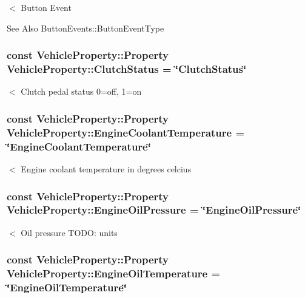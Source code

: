 $<$ Button Event\begin{DoxySeeAlso}{See Also}
Button\-Events\-::\-Button\-Event\-Type 
\end{DoxySeeAlso}
\hypertarget{classVehicleProperty_acdca2ca718fd392c7ad9b8adc817baec}{
\subsubsection[{Clutch\-Status}]{\setlength{\rightskip}{0pt plus 5cm}const Vehicle\-Property\-::\-Property Vehicle\-Property\-::\-Clutch\-Status = \char`\"{}Clutch\-Status\char`\"{}\hspace{0.3cm}{\ttfamily [static]}}}\label{classVehicleProperty_acdca2ca718fd392c7ad9b8adc817baec}
$<$ Clutch pedal status 0=off, 1=on \hypertarget{classVehicleProperty_ae4f240ad9cecbbb9d0cb3a615865b60a}{
\subsubsection[{Engine\-Coolant\-Temperature}]{\setlength{\rightskip}{0pt plus 5cm}const Vehicle\-Property\-::\-Property Vehicle\-Property\-::\-Engine\-Coolant\-Temperature = \char`\"{}Engine\-Coolant\-Temperature\char`\"{}\hspace{0.3cm}{\ttfamily [static]}}}\label{classVehicleProperty_ae4f240ad9cecbbb9d0cb3a615865b60a}
$<$ Engine coolant temperature in degrees celcius \hypertarget{classVehicleProperty_ab7fad273c7149dbd338f53f2536aca26}{
\subsubsection[{Engine\-Oil\-Pressure}]{\setlength{\rightskip}{0pt plus 5cm}const Vehicle\-Property\-::\-Property Vehicle\-Property\-::\-Engine\-Oil\-Pressure = \char`\"{}Engine\-Oil\-Pressure\char`\"{}\hspace{0.3cm}{\ttfamily [static]}}}\label{classVehicleProperty_ab7fad273c7149dbd338f53f2536aca26}
$<$ Oil pressure T\-O\-D\-O\-: units \hypertarget{classVehicleProperty_a9d4a610d94b12f139ea00b271804a73f}{
\subsubsection[{Engine\-Oil\-Temperature}]{\setlength{\rightskip}{0pt plus 5cm}const Vehicle\-Property\-::\-Property Vehicle\-Property\-::\-Engine\-Oil\-Temperature = \char`\"{}Engine\-Oil\-Temperature\char`\"{}\hspace{0.3cm}{\ttfamily [static]}}}\label{classVehicleProperty_a9d4a610d94b12f139ea00b271804a73f}

